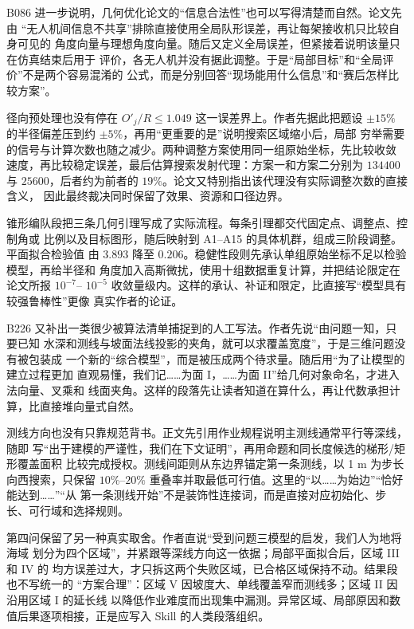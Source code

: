 \documentclass[UTF8,a4paper,12pt]{ctexart}
\begin{document}
B086 进一步说明，几何优化论文的“信息合法性”也可以写得清楚而自然。论文先由
“无人机间信息不共享”排除直接使用全局队形误差，再让每架接收机只比较自身可见的
角度向量与理想角度向量。随后又定义全局误差，但紧接着说明该量只在仿真结束后用于
评价，各无人机并没有据此调整。于是“局部目标”和“全局评价”不是两个容易混淆的
公式，而是分别回答“现场能用什么信息”和“赛后怎样比较方案”。

径向预处理也没有停在 $O'_j/R\leq1.049$ 这一误差界上。作者先据此把题设
$\pm15\%$ 的半径偏差压到约 $\pm5\%$，再用“更重要的是”说明搜索区域缩小后，局部
穷举需要的信号与计算次数也随之减少。两种调整方案使用同一组原始坐标，先比较收敛
速度，再比较稳定误差，最后估算搜索发射代理：方案一和方案二分别为 $134400$ 与
$25600$，后者约为前者的 $19\%$。论文又特别指出该代理没有实际调整次数的直接含义，
因此最终裁决同时保留了效果、资源和口径边界。

锥形编队段把三条几何引理写成了实际流程。每条引理都交代固定点、调整点、控制角或
比例以及目标图形，随后映射到 A1--A15 的具体机群，组成三阶段调整。平面拟合检验值
由 $3.893$ 降至 $0.206$。稳健性段则先承认单组原始坐标不足以检验模型，再给半径和
角度加入高斯微扰，使用十组数据重复计算，并把结论限定在论文所报 $10^{-7}$--
$10^{-5}$ 收敛量级内。这样的承认、补证和限定，比直接写“模型具有较强鲁棒性”更像
真实作者的论证。

B226 又补出一类很少被算法清单捕捉到的人工写法。作者先说“由问题一知，只要已知
水深和测线与坡面法线投影的夹角，就可以求覆盖宽度”，于是三维问题没有被包装成
一个新的“综合模型”，而是被压成两个待求量。随后用“为了让模型的建立过程更加
直观易懂，我们记……为面 I，……为面 II”给几何对象命名，才进入法向量、叉乘和
线面夹角。这样的段落先让读者知道在算什么，再让代数承担计算，比直接堆向量式自然。

测线方向也没有只靠规范背书。正文先引用作业规程说明主测线通常平行等深线，随即
写“出于建模的严谨性，我们在下文证明”，再用命题和同长度候选的梯形/矩形覆盖面积
比较完成授权。测线间距则从东边界锚定第一条测线，以 1 m 为步长向西搜索，只保留
$10\%$--$20\%$ 重叠率并取最低可行值。这里的“以……为始边”“恰好能达到……”“从
第一条测线开始”不是装饰性连接词，而是直接对应初始化、步长、可行域和选择规则。

第四问保留了另一种真实取舍。作者直说“受到问题三模型的启发，我们人为地将海域
划分为四个区域”，并紧跟等深线方向这一依据；局部平面拟合后，区域 III 和 IV 的
均方误差过大，才只拆这两个失败区域，已合格区域保持不动。结果段也不写统一的
“方案合理”：区域 V 因坡度大、单线覆盖窄而测线多；区域 II 因沿用区域 I 的延长线
以降低作业难度而出现集中漏测。异常区域、局部原因和数值后果逐项相接，正是应写入
Skill 的人类段落组织。
\end{document}
